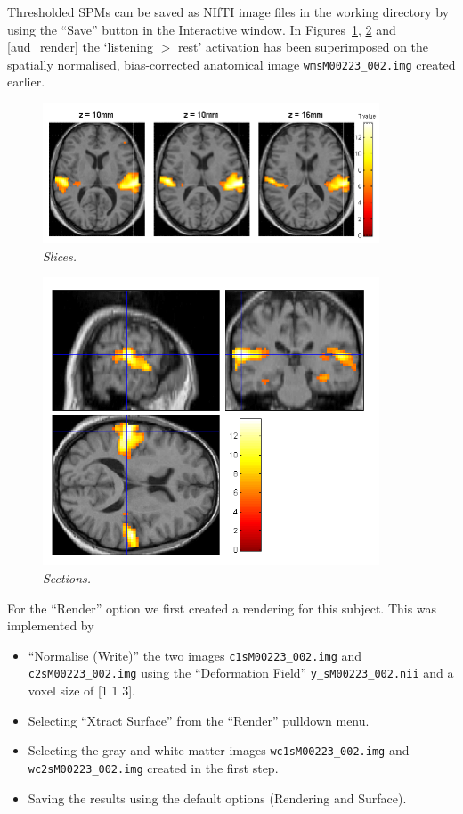 Thresholded SPMs can be saved as NIfTI image files in the working directory by using the ``Save'' button in the Interactive window. In Figures~\ref{aud_slices}, \ref{aud_sections} and \ref{aud_render} the `listening $>$ rest' activation has been superimposed on the spatially normalised, bias-corrected anatomical image \texttt{wmsM00223\_002.img} created earlier. 

\begin{figure}
\begin{center}
\includegraphics[width=100mm]{auditory/slices}
\caption{\emph{Slices.} \label{aud_slices} }
\end{center}
\end{figure}

\begin{figure}
\begin{center}
\includegraphics[width=100mm]{auditory/sections}
\caption{\emph{Sections.} \label{aud_sections} }
\end{center}
\end{figure}

For the ``Render'' option we first created a rendering for this subject. This was implemented by 

\begin{itemize}
\item ``Normalise (Write)'' the two images \texttt{c1sM00223\_002.img} and \texttt{c2sM00223\_002.img} using the ``Deformation Field'' \texttt{y\_sM00223\_002.nii} and a voxel size of [1 1 3].
\item Selecting ``Xtract Surface'' from the ``Render'' pulldown menu.
\item Selecting the gray and white matter images \texttt{wc1sM00223\_002.img} and \texttt{wc2sM00223\_002.img} created in the first step.
\item Saving the results using the default options (Rendering and Surface).
\end{itemize}

